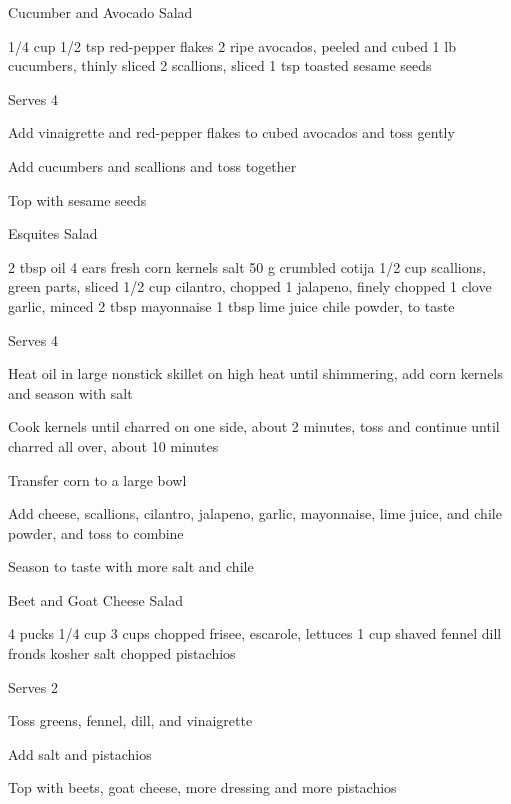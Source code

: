 \begin{denserecipe}{Cucumber and Avocado Salad}{}
\begin{ingredients}
1/4 cup 
1/2 tsp red-pepper flakes
2 ripe avocados, peeled and cubed
1 lb cucumbers, thinly sliced
2 scallions, sliced
1 tsp toasted sesame seeds
\end{ingredients}
\nextcolumn
Serves 4
\begin{steps}
\item Add vinaigrette and red-pepper flakes to cubed avocados and toss gently
\item Add cucumbers and scallions and toss together
\item Top with sesame seeds
\end{steps}
\end{denserecipe}

\begin{denserecipe}{Esquites Salad}{}
\begin{ingredients}
2 tbsp oil
4 ears fresh corn kernels
salt
50 g crumbled cotija
1/2 cup scallions, green parts, sliced
1/2 cup cilantro, chopped
1 jalapeno, finely chopped
1 clove garlic, minced
2 tbsp mayonnaise
1 tbsp lime juice
chile powder, to taste
\end{ingredients}
\nextcolumn
Serves 4
\begin{steps}
    \item Heat oil in large nonstick skillet on high heat until shimmering, add corn kernels and season with salt
    \item Cook kernels until charred on one side, about 2 minutes, toss and continue until charred all over, about 10 minutes
    \item Transfer corn to a large bowl
    \item Add cheese, scallions, cilantro, jalapeno, garlic, mayonnaise, lime juice, and chile powder, and toss to combine
    \item Season to taste with more salt and chile
\end{steps}
\end{denserecipe}

\begin{denserecipe}{Beet and Goat Cheese Salad}{}
\begin{ingredients}
4 pucks 
1/4 cup 
3 cups chopped frisee, escarole, lettuces
1 cup shaved fennel
dill fronds
kosher salt
chopped pistachios
\end{ingredients}
\nextcolumn
Serves 2
\begin{steps}
\item Toss greens, fennel, dill, and vinaigrette
\item Add salt and pistachios
\item Top with beets, goat cheese, more dressing and more pistachios
\end{steps}
\end{denserecipe}

